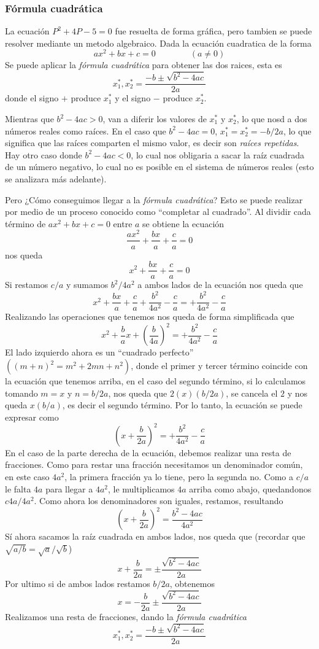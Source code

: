 \subsubsection{Fórmula cuadrática}

La ecuación \(P^2+4P -5 = 0\) fue resuelta de forma gráfica, pero tambien se puede resolver mediante un metodo algebraico. Dada la ecuación cuadratica de la forma 
\[
ax^2+bx+c=0 \qquad \qquad (a \neq 0)
\]
Se puede aplicar la \textit{fórmula cuadrática} para obtener las dos raices, esta es 
\[
x_1^\ast, x_2^\ast = \frac{-b \pm \sqrt{b^2-4ac}}{2a}
\]
donde el signo \(+\) produce \(x_1^\ast\) y el signo \(-\) produce \(x_2^\ast\).

Mientras que \(b^2-4ac>0\), van a diferir los valores de \(x_1^\ast\) y \(x_2^\ast\), lo que nosd a dos números reales como raíces. En el caso que \(b^2-4ac = 0\), \(x_1^\ast = x_2^\ast = -b/2a\), lo que significa que las raíces comparten el mismo valor, es decir son \textit{raíces repetidas}. Hay otro caso donde \(b^2-4ac<0\), lo cual nos obligaria a sacar la raíz cuadrada de un número negativo, lo cual no es posible en el sistema de números reales (esto se analizara más adelante).

Pero ¿Cómo conseguimos llegar a la \textit{fórmula cuadrática}? Esto se puede realizar por medio de un proceso conocido como ``completar al cuadrado''. Al dividir cada término de \(ax^2+bx+c=0\) entre \(a\) se obtiene la ecuación 
\[
\frac{ax^2}{a}+\frac{bx}{a}+\frac{c}{a}=0
\]
nos queda 
\[
x^2+\frac{bx}{a}+\frac{c}{a}=0
\]
Si restamos \(c/a\) y sumamos \(b^2/4a^2\) a ambos lados de la ecuación nos queda que 
\[
x^2+\frac{bx}{a}+\frac{c}{a} + \frac{b^2}{4a^2} - \frac{c}{a} = + \frac{b^2}{4a^2} - \frac{c}{a}
\]
Realizando las operaciones que tenemos nos queda de forma simplificada que 
\[
x^2+\frac{b}{a}x + (\frac{b}{4a})^2 = + \frac{b^2}{4a^2} - \frac{c}{a}
\]
El lado izquierdo ahora es un ``cuadrado perfecto'' \(((m+n)^2=m^2+2mn+n^2)\), donde el primer y tercer término coincide con la ecuación que tenemos arriba, en el caso del segundo término, si lo calculamos tomando \(m = x\) y \(n=b/2a\), nos queda que \(2(x)(b/2a)\), se cancela el \(2\) y nos queda \(x(b/a)\), es decir el segundo término. Por lo tanto, la ecuación se puede expresar como 
\[
(x+\frac{b}{2a})^2 = + \frac{b^2}{4a^2} - \frac{c}{a}
\]
En el caso de la parte derecha de la ecuación, debemos realizar una resta de fracciones. Como para restar una fracción necesitamos un denominador común, en este caso \(4a^2\), la primera fracción ya lo tiene, pero la segunda no. Como a \(c/a\) le falta \(4a\) para llegar a \(4a^2\), le multiplicamos \(4a\) arriba como abajo, quedandonos \(c4a/4a^2\). Como ahora los denominadores son iguales, restamos, resultando
\[
(x+\frac{b}{2a})^2 = \frac{b^2-4ac}{4a^2}
\]
Sí ahora sacamos la raíz cuadrada en ambos lados, nos queda que  (recordar que \(\sqrt{a/b} = \sqrt{a}/\sqrt{b}\))
\[
x+\frac{b}{2a} = \pm \frac{\sqrt{b^2-4ac}}{2a}
\]
Por ultimo si de ambos lados restamos \(b/2a\), obtenemos
\[
x = -\frac{b}{2a} \pm \frac{\sqrt{b^2-4ac}}{2a}
\]
Realizamos una resta de fracciones, dando la \textit{fórmula cuadrática}
\[
x_1^\ast, x_2^\ast = \frac{-b \pm \sqrt{b^2-4ac}}{2a}
\]

